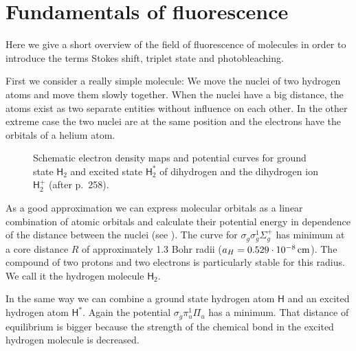 \newenvironment{fenster}{%
  \begin{addmargin*}[
  5em]{5em}%
    \begin{minipage}{\linewidth}%
    \vspace{1em}
      \rule{\linewidth}{2pt}%
}{%
    \rule[
.25\baselineskip]{\linewidth}{2pt}%
\vspace{1em}
    \end{minipage}%
  \end{addmargin*}%
}
\renewcommand{\H}{\textsf{H}}
\renewcommand{\O}{\textsf{O}}
\section{Fundamentals of fluorescence}
\begin{summary}
  Here we give a short overview of the field of fluorescence of
  molecules in order to introduce the terms Stokes shift, triplet
  state and photobleaching.
\end{summary}
First we consider a really simple molecule: We move the nuclei of two
hydrogen atoms and move them slowly together. When the nuclei have a
big distance, the atoms exist as two separate entities without
influence on each other. In the other extreme case the two nuclei are
at the same position and the electrons have the orbitals of a helium
atom.

\begin{figure}[!hbt]
  \centering
  
  \caption{Schematic electron density maps and potential curves for
    ground state $\H_2$ and excited state $\H_2^*$ of dihydrogen and
    the dihydrogen ion $\H_2^+$ (after \cite{Haken2006} p.~258).}
  \label{fig:flu-potential_my}
\end{figure}
As a good approximation we can express molecular orbitals as a linear
combination of atomic orbitals and calculate their potential energy in
dependence of the distance between the nuclei (see
). The curve for
$\sigma_g\sigma_g^1\Sigma_g^+$ has minimum at a core distance $R$ of
approximately 1.3 Bohr radii ($a_H=\unit[0.529\cdot10^{-8}]{cm}$). The
compound of two protons and two electrons is particularly stable for
this radius. We call it the hydrogen molecule $\H_2$.

In the same way we can combine a ground state hydrogen atom $\H$ and
an excited hydrogen atom $\H^*$. Again the potential
$\sigma_g\pi_u^1\Pi_u$ has a minimum. That distance of equilibrium is
bigger because the strength of the chemical bond in the excited
hydrogen molecule is decreased.

